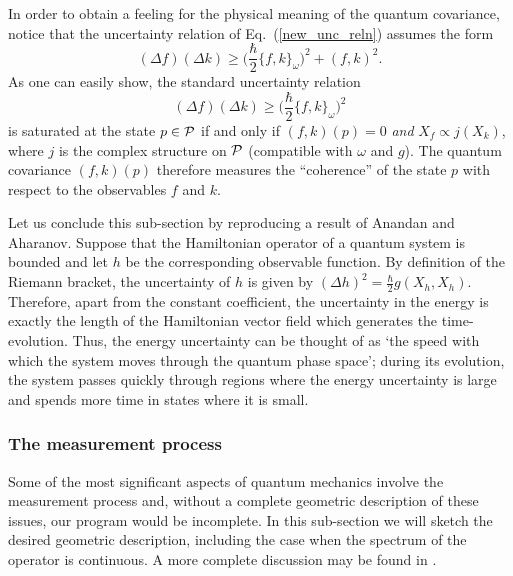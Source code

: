 \documentclass[12pt,aps,eqsecnum,tighten,nofootinbib]{revtex4-2}
\def\be{\begin{equation}}
\def\ee{\end{equation}}
\def\P{{\cal P}}
\def\w{\omega}
\newcommand{\eqn}[1]{Eq.~(\ref{#1})}
\newcommand{\hvf}[1]{{X_{#1}}}
\begin{document}
In order to obtain a feeling for the physical meaning of the quantum
covariance, notice that the uncertainty relation of \eqn{new_unc_reln}
assumes the form
%
\be
(\Delta f) (\Delta k) \ge
\bigg( \frac{\hbar}{2} \{ f, k\}_\w \bigg)^2 + ( f, k )^2.
\ee
%
As one can easily show, the standard uncertainty relation
%
\be
(\Delta f) (\Delta k) \ge
\bigg( \frac{\hbar}{2} \{ f, k\}_\w \bigg)^2
\ee
%
is saturated at the state $p \in \P$ if and only if $(f, k)(p) = 0$
{\em and} $\hvf{f} \propto j(\hvf{k})$, where $j$ is the complex
structure on $\P$ (compatible with $\omega$ and $g$).  The quantum
covariance $(f, k)(p)$ therefore measures the ``coherence'' of the
state $p$ with respect to the observables $f$ and $k$.

Let us conclude this sub-section by reproducing a result of Anandan
and Aharanov\cite{anandan}. Suppose that the Hamiltonian operator of a
quantum system is bounded and let $h$ be the corresponding observable
function.  By definition of the Riemann bracket, the uncertainty of
$h$ is given by $(\Delta h)^2 = \frac{\hbar}{2} g(\hvf{h}, \hvf{h})$.
Therefore, apart from the constant coefficient, the uncertainty in the
energy is exactly the length of the Hamiltonian vector field which
generates the time-evolution. Thus, the energy uncertainty can be
thought of as `the speed with which the system moves through the
quantum phase space'; during its evolution, the system passes quickly
through regions where the energy uncertainty is large and spends more
time in states where it is small.


\subsubsection{The measurement process}

Some of the most significant aspects of quantum mechanics involve the
measurement process and, without a complete geometric description of
these issues, our program would be incomplete. In this sub-section we
will sketch the desired geometric description, including the case when
the spectrum of the operator is continuous. A more complete discussion
may be found in \cite{thesis}.
\end{document}
